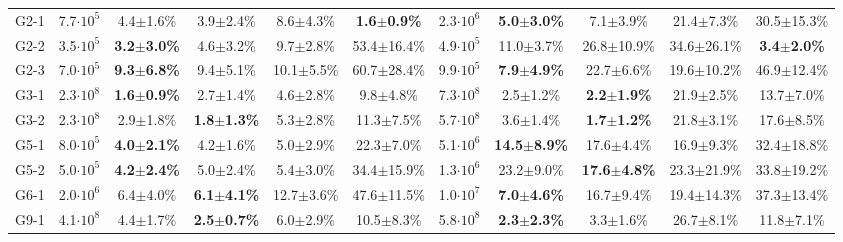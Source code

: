 \documentclass{article}
\begin{document}
\begin{table*}[t]
{\begin{tabular}{*{11}{c}}
        G2-1 & 7.7$\cdot 10^{5}$ & 4.4$\pm$1.6\% & 3.9$\pm$2.4\% & 8.6$\pm$4.3\%  & \textbf{1.6$\pm$0.9\%}&    2.3$\cdot 10^{6}$ & \textbf{5.0$\pm$3.0\%} & 7.1$\pm$3.9\% & 21.4$\pm$7.3\%  & 30.5$\pm$15.3\%\\
        G2-2 & 3.5$\cdot 10^{5}$ & \textbf{3.2$\pm$3.0\%} & 4.6$\pm$3.2\% & 9.7$\pm$2.8\%  & 53.4$\pm$16.4\%&  4.9$\cdot 10^{5}$ & 11.0$\pm$3.7\% & 26.8$\pm$10.9\% & 34.6$\pm$26.1\%  & \textbf{3.4$\pm$2.0\%}\\
        G2-3 & 7.0$\cdot 10^{5}$ & \textbf{9.3$\pm$6.8\%} & 9.4$\pm$5.1\% & 10.1$\pm$5.5\%  & 60.7$\pm$28.4\%& 9.9$\cdot 10^{5}$ & \textbf{7.9$\pm$4.9\%} & 22.7$\pm$6.6\% & 19.6$\pm$10.2\%  & 46.9$\pm$12.4\%\\
        G3-1 & 2.3$\cdot 10^{8}$ & \textbf{1.6$\pm$0.9\%} & 2.7$\pm$1.4\% & 4.6$\pm$2.8\%  & 9.8$\pm$4.8\%&    7.3$\cdot 10^{8}$ & 2.5$\pm$1.2\% & \textbf{2.2$\pm$1.9\%} & 21.9$\pm$2.5\%  & 13.7$\pm$7.0\%\\
        G3-2 & 2.3$\cdot 10^{8}$ & 2.9$\pm$1.8\% & \textbf{1.8$\pm$1.3\%} & 5.3$\pm$2.8\%  & 11.3$\pm$7.5\%&   5.7$\cdot 10^{8}$ & 3.6$\pm$1.4\% & \textbf{1.7$\pm$1.2\%} & 21.8$\pm$3.1\%  & 17.6$\pm$8.5\%\\
        G5-1 & 8.0$\cdot 10^{5}$ & \textbf{4.0$\pm$2.1\%} & 4.2$\pm$1.6\% & 5.0$\pm$2.9\%  & 22.3$\pm$7.0\%&   5.1$\cdot 10^{6}$ & \textbf{14.5$\pm$8.9\%} & 17.6$\pm$4.4\% & 16.9$\pm$9.3\%  & 32.4$\pm$18.8\%\\
        G5-2 & 5.0$\cdot 10^{5}$ & \textbf{4.2$\pm$2.4\%} & 5.0$\pm$2.4\% & 5.4$\pm$3.0\%  & 34.4$\pm$15.9\%&  1.3$\cdot 10^{6}$ & 23.2$\pm$9.0\% & \textbf{17.6$\pm$4.8\%} & 23.3$\pm$21.9\%  & 33.8$\pm$19.2\%\\
        G6-1 & 2.0$\cdot 10^{6}$ & 6.4$\pm$4.0\% & \textbf{6.1$\pm$4.1\%} & 12.7$\pm$3.6\%  & 47.6$\pm$11.5\%& 1.0$\cdot 10^{7}$ & \textbf{7.0$\pm$4.6\%} & 16.7$\pm$9.4\% & 19.4$\pm$14.3\%  & 37.3$\pm$13.4\%\\
        G9-1 & 4.1$\cdot 10^{8}$ & 4.4$\pm$1.7\% & \textbf{2.5$\pm$0.7\%} & 6.0$\pm$2.9\%  & 10.5$\pm$8.3\%&   5.8$\cdot 10^{8}$ & \textbf{2.3$\pm$2.3\%} & 3.3$\pm$1.6\% & 26.7$\pm$8.1\%  & 11.8$\pm$7.1\%\\
        \bottomrule
    \end{tabular}
}
\end{table*}
\end{document}
